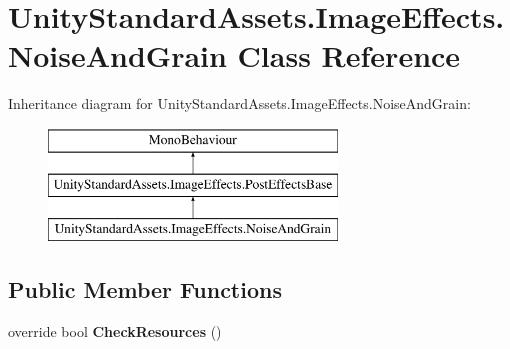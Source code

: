 \hypertarget{class_unity_standard_assets_1_1_image_effects_1_1_noise_and_grain}{}\section{Unity\+Standard\+Assets.\+Image\+Effects.\+Noise\+And\+Grain Class Reference}
\label{class_unity_standard_assets_1_1_image_effects_1_1_noise_and_grain}
Inheritance diagram for Unity\+Standard\+Assets.\+Image\+Effects.\+Noise\+And\+Grain\+:\begin{figure}[H]
\begin{center}
\leavevmode
\includegraphics[height=3.000000cm]{class_unity_standard_assets_1_1_image_effects_1_1_noise_and_grain}
\end{center}
\end{figure}
\subsection*{Public Member Functions}
\begin{DoxyCompactItemize}
\item 
override bool {\bfseries Check\+Resources} ()\hypertarget{class_unity_standard_assets_1_1_image_effects_1_1_noise_and_grain_ab7994ccecddd5183487f9dfee8bf7ab5}{}\label{class_unity_standard_assets_1_1_image_effects_1_1_noise_and_grain_ab7994ccecddd5183487f9dfee8bf7ab5}

\end{DoxyCompactItemize}
